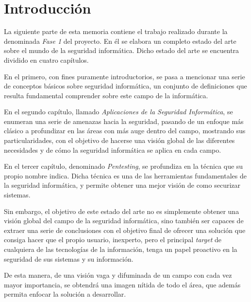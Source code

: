 \chapter{Introducción}

La siguiente parte de esta memoria contiene el trabajo realizado durante la denominada \textit{Fase 1} del proyecto. En él se elabora un completo estado del arte sobre el mundo de la seguridad informática. Dicho estado del arte se encuentra dividido en cuatro capítulos.

En el primero, con fines puramente introductorios, se pasa a mencionar una serie de conceptos básicos sobre seguridad informática, un conjunto de definiciones que resulta fundamental comprender sobre este campo de la informática.

En el segundo capítulo, llamado \textit{Aplicaciones de la Seguridad Informática}, se enumeran una serie de amenazas hacia la seguridad, pasando de un enfoque más clásico a profundizar en las áreas con más auge dentro del campo, mostrando sus particularidades, con el objetivo de hacerse una visión global de las diferentes necesidades y de cómo la seguridad informática se aplica en cada campo.

En el tercer capítulo, denominado \textit{Pentesting}, se profundiza en la técnica que su propio nombre indica. Dicha técnica es una de las herramientas fundamentales de la seguridad informática, y permite obtener una mejor visión de como securizar sistemas.

Sin embargo, el objetivo de este estado del arte no es simplemente obtener una visión global del campo de la seguridad informática, sino también ser capaces de extraer una serie de conclusiones con el objetivo final de ofrecer una solución que consiga hacer que el propio usuario, inexperto, pero el principal \textit{target} de cualquiera de las tecnologías de la información, tenga un papel proactivo en la seguridad de sus sistemas y su información.

De esta manera, de una visión vaga y difuminada de un campo con cada vez mayor importancia, se obtendrá una imagen nítida de todo el área, que además permita enfocar la solución a desarrollar.